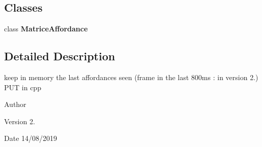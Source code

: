 \subsection*{Classes}
\begin{DoxyCompactItemize}
\item 
class \textbf{ Matrice\+Affordance}
\end{DoxyCompactItemize}


\subsection{Detailed Description}
keep in memory the last affordances seen (frame in the last 800ms \+: in version 2.) P\+UT in cpp 

\begin{DoxyAuthor}{Author}

\end{DoxyAuthor}
\begin{DoxyVersion}{Version}
2. 
\end{DoxyVersion}
\begin{DoxyDate}{Date}
14/08/2019 
\end{DoxyDate}
